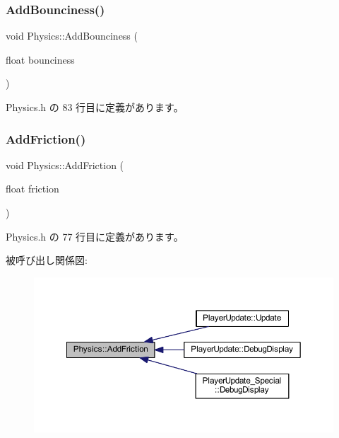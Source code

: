 \subsubsection{\texorpdfstring{Add\+Bounciness()}{AddBounciness()}}
{\footnotesize\ttfamily void Physics\+::\+Add\+Bounciness (\begin{DoxyParamCaption}\item[{float}]{bounciness }\end{DoxyParamCaption})\hspace{0.3cm}{\ttfamily [inline]}}



 Physics.\+h の 83 行目に定義があります。

\mbox{\label{class_physics_a77e9a04f034ccad4fec996832fb7ce63}} 
\subsubsection{\texorpdfstring{Add\+Friction()}{AddFriction()}}
{\footnotesize\ttfamily void Physics\+::\+Add\+Friction (\begin{DoxyParamCaption}\item[{float}]{friction }\end{DoxyParamCaption})\hspace{0.3cm}{\ttfamily [inline]}}



 Physics.\+h の 77 行目に定義があります。

被呼び出し関係図\+:\nopagebreak
\begin{figure}[H]
\begin{center}
\leavevmode
\includegraphics[width=350pt]{class_physics_a77e9a04f034ccad4fec996832fb7ce63_icgraph}
\end{center}
\end{figure}
\mbox{\label{class_physics_af6ad00988f0aa878285b930121d4748c}} 
